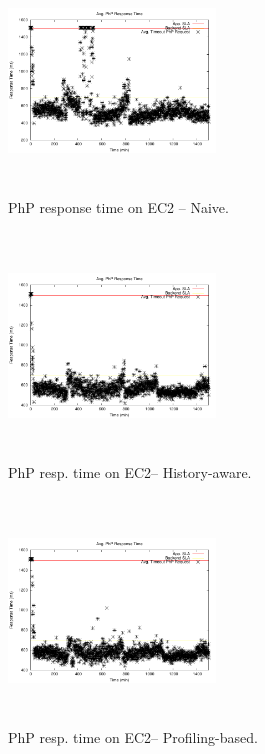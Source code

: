 
\begin{figure}
\begin{center}
\includegraphics[width=0.49\textwidth, height=6cm]{./images/heterogeneous/avgTimeout_PhP_naive}
\end{center}
\caption{PhP  response time on EC2 -- Naive.}
\label{naiveEC2}
\end{figure}


\begin{figure}
\begin{center}
\includegraphics[width=0.49\textwidth, height=6cm]{./images/heterogeneous/avgTimeout_PhP_history}
\end{center}
\caption{PhP resp. time on EC2-- History-aware.}
\label{historyEC2}
\end{figure}

\begin{figure}
\begin{center}
\includegraphics[width=0.49\textwidth, height=6cm]{./images/heterogeneous/avgTimeout_PhP_weightHistory}
\end{center}
\caption{ PhP resp. time on EC2-- Profiling-based.}
\label{historyWeightEC2}
\end{figure}

